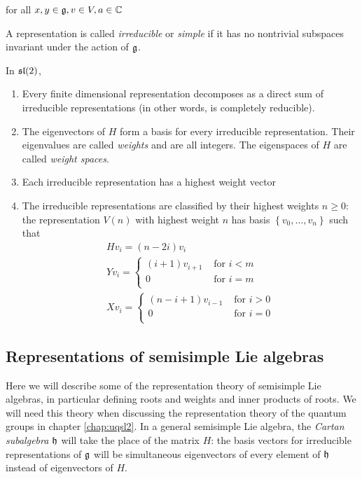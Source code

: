 for all $x,y \in \mathfrak{g}, v \in V, a \in \mathbb{C}$

A representation is called \emph{irreducible} or \emph{simple} if it has no
nontrivial subspaces invariant under the action of $\mathfrak{g}$.

In $\mathfrak{sl}(2)$,
\begin{enumerate}
    \item Every finite dimensional representation decomposes as a direct sum of
          irreducible representations (in other words, is completely reducible).
    \item The eigenvectors of $H$ form a basis for every irreducible
          representation. Their eigenvalues are called \emph{weights} and are
          all integers. The eigenspaces of $H$ are called \emph{weight spaces}.  
    \item Each irreducible representation has a highest weight vector
    \item The irreducible representations are classified by their highest
          weights $n \geq 0$: the representation $V(n)$ with highest weight $n$
          has basis $\left\{ v_0, \ldots, v_n \right\}$ such that 
\begin{align*}
    &H v_i = (n - 2i) v_i& \\
    &Y v_i = \begin{cases} 
                (i+1)v_{i+1}& \text{ for $i < m$} \\
                0& \text{ for $i = m$} \\
            \end{cases} \\
    &X v_i = \begin{cases} 
                (n-i+1)v_{i-1}& \text{ for $i > 0$} \\
                0& \text{ for $i = 0$} \\
            \end{cases}
\end{align*}
\end{enumerate}




\subsection{Representations of semisimple Lie algebras}

Here we will describe some of the representation theory of semisimple Lie
algebras, in particular defining roots and weights and inner products of roots.
We will need this theory when discussing the representation theory of the
quantum groups in chapter \ref{chap:uqsl2}. 
In a general semisimple Lie algebra, the \emph{Cartan subalgebra}
$\mathfrak{h}$ will take the place of the matrix $H$: the basis vectors for
irreducible representations of $\mathfrak{g}$ will be simultaneous eigenvectors of
every element of $\mathfrak{h}$ instead of eigenvectors of $H$.

